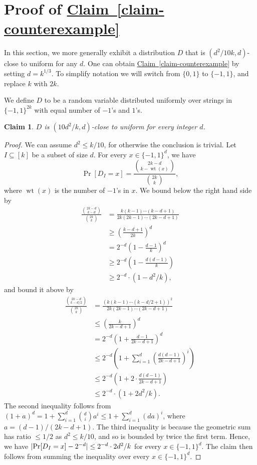 \documentclass[11pt]{article}
\numberwithin{equation}{section}
\newtheorem{claim}[theorem]{Claim}
\theoremstyle{definition}
\theoremstyle{plain}
\newcommand{\expref}[2]{\hyperref[#2]{#1~\ref{#2}}}
\newcommand{\zo}{\{0,1\}}
\def\pmone{\{-1, 1\}}
\DeclarePairedDelimiter{\abs}{\lvert}{\rvert}
\DeclareMathOperator{\wtt}{wt}  %
\begin{document}
\section{Proof of \expref{Claim}{claim-counterexample}} \label{s-counterex}
In this section, we more generally exhibit a distribution $D$ that is $(d^2/10k,d)$-close to uniform for any $d$.
One can obtain \expref{Claim}{claim-counterexample} by setting $d = k^{1/3}$.
 To simplify notation we will switch from $\zo$ to $\pmone$, and replace $k$ with $2k$.

 We define $D$ to be a random variable distributed uniformly over strings in $\pmone^{2k}$ with equal number of $-1$'s and $1$'s.
  \begin{claim}
    $D$ is $(10 d^2 / k, d)$-close to uniform for every integer $d$.
  \end{claim}
  \begin{proof}
    We can assume $d^2 \le k/10$, for otherwise the conclusion is trivial.
    Let $I \subseteq [k]$ be a subset of size $d$.
    For every $x \in \pmone^d$, we have
    \[
      \Pr[D_I = x] = \frac{\binom{2k - d}{k - 
          \wtt(x)  %
  }}{\binom{2k}{k}} ,
    \]
    where
    $\wtt(x)$  %
    is the number of $-1$'s in $x$.
    We bound below the right hand side by
    \begin{align*}
      \frac{\binom{2k - d}{k - d}}{\binom{2k}{k}}
      &= \frac{k (k-1) \cdots (k - d + 1)}{2k (2k - 1) \cdots (2k - d + 1)} \\
      &\ge \left( \frac{k - d + 1}{2k} \right)^d \\
      &= 2^{-d} \left(1 - \frac{d - 1}{k} \right)^d \\
      &\ge 2^{-d} \left(1 - \frac{d (d - 1)}{k} \right) \\
      &\ge 2^{-d} \cdot (1 - d^2 / k),
    \end{align*}
    and bound it above by
    \begin{align*}
      \frac{\binom{2k - d}{k - d/2}}{\binom{2k}{k}}
      &= \frac{(k (k-1) \cdots (k - d/2 + 1))^2}{2k(2k - 1) \cdots (2k - d + 1)} \\
      &\le \left( \frac{k}{2k - d + 1} \right)^d \\
      &= 2^{-d} \left(1 + \frac{d-1}{2k - d + 1} \right)^d \\
      &\le 2^{-d} \left( 1 + \sum_{i=1}^d \left( \frac{d(d-1)}{2k - d + 1} \right)^i \right) \\
      &\le 2^{-d} \left( 1 + 2 \cdot \frac{d(d-1)}{2k - d + 1} \right) \\
      &\le 2^{-d} \cdot ( 1 + 2 d^2 / k) .
    \end{align*}
    The second inequality follows from $(1 + a)^d = 1 + \sum_{i=1}^d \binom{d}{i} a^i \le 1 + \sum_{i=1}^d (da)^i$, where $a = (d-1)/(2k-d+1)$.
    The third inequality is because the geometric sum has ratio $\le 1/2$ as $d^2 \le k/10$, and so is bounded by twice the first term.
    Hence, we have $\abs{\Pr[D_I = x] - 2^{-d}} \le 2^{-d} \cdot 2d^2 / k$ for every $x \in \pmone^d$.
    The claim then follows from summing the inequality over every $x \in \pmone^d$.
  \end{proof}
\end{document}
